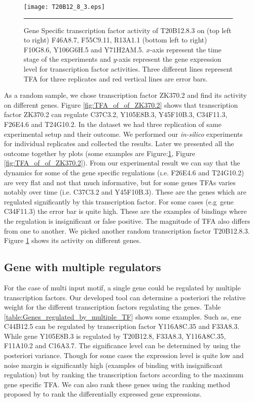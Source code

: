 \begin{figure}
	\centering
		\texttt{[image: T20B12\_8\_3.eps]}
		\rule{35em}{0.5pt}
	\caption[Gene Specific transcription factor activity of T20B12.8.3]
		{Gene Specific transcription factor activity of T20B12.8.3 on (top left to right) F46A8.7, F55C9.11, R13A1.1 (bottom left to right) F10G8.6, Y106G6H.5 and Y71H2AM.5. $x$-axis represent the time stage of the experiments and $y$-axis represent the gene expression level for transcription factor activities. Three different lines represent TFA for three replicates and red vertical lines are error bars.}
	\label{fig:TFA_of_of_T20B12_8_3}
\end{figure}

As a random sample, we chose transcription factor ZK370.2 and find its activity on different genes. Figure \ref{fig:TFA_of_of_ZK370.2} shows that transcription factor ZK370.2 can regulate C37C3.2, Y105E8B.3, Y45F10B.3, C34F11.3, F26E4.6 and T24G10.2. In the dataset we had three replication of same experimental setup and their outcome. We performed our \textit{in-silico} experiments for individual replicates and collected the results. Later we presented all the outcome together by plots (some examples are Figure:\ref{fig:TFA_of_of_T20B12_8_3}, Figure \ref{fig:TFA_of_of_ZK370.2}). From our experimental result we can say that the dynamics for some of the gene specific regulations (\i.e. F26E4.6 and T24G10.2) are very flat and not that much informative, but for some genes TFAs varies notably over time (i.e. C37C3.2 and Y45F10B.3). These are the genes which are regulated significantly by this transcription factor. For some cases (e.g\ gene C34F11.3) the error bar is quite high. These are the examples of bindings where the regulation is insignificant or false positive. The magnitude of TFA also differs from one to another. We picked another random transcription factor T20B12.8.3. Figure \ref{fig:TFA_of_of_T20B12_8_3} shows its activity on different genes.

\subsection{Gene with multiple regulators}
For the case of multi input motif, a single gene could be regulated by multiple transcription factors. Our developed tool can determine a posteriori the relative weight for the different transcription factors regulating the genes. Table \ref{table:Genes_regulated_by_multiple_TF} shows some examples. Such as, ene C44B12.5 can be regulated by transcription factor Y116A8C.35 and F33A8.3. While gene Y105E8B.3 is regulated by T20B12.8, F33A8.3, Y116A8C.35, F11A10.2 and C16A3.7. The significance level can be determined by using the posteriori variance. Though for some cases the expression level is quite low and noise margin is significantly high (examples of binding with insignificant regulation) but by ranking the transcription factors according to the maximum gene specific TFA. We can also rank these genes using the ranking method proposed by \cite{Kalaitzis:2011} to rank the differentially expressed gene expressions.


